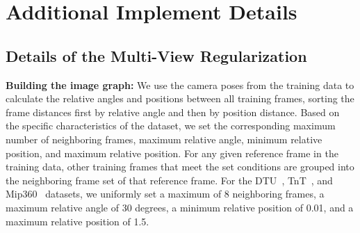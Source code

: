 \clearpage
\setcounter{page}{13}
\setcounter{section}{0}
\setcounter{table}{0}
\setcounter{figure}{0}
\setcounter{equation}{0}
\renewcommand{\thetable}{\thesection\arabic{table}}
\renewcommand{\thefigure}{\thesection\arabic{figure}}
\renewcommand{\theequation}{\thesection\arabic{equation}}

%  

% 



\color{r}

\section{Additional Implement Details}

\subsection{Details of the Multi-View Regularization}
\textbf{Building the image graph:} We use the camera poses from the training data to calculate the relative angles and positions between all training frames, sorting the frame distances first by relative angle and then by position distance. Based on the specific characteristics of the dataset, we set the corresponding maximum number of neighboring frames, maximum relative angle, minimum relative position, and maximum relative position. For any given reference frame in the training data, other training frames that meet the set conditions are grouped into the neighboring frame set of that reference frame. For the DTU~\cite{jensen2014large}, TnT~\cite{knapitsch2017tanks}, and Mip360~\cite{barron2021mip} datasets, we uniformly set a maximum of 8 neighboring frames, a maximum relative angle of 30 degrees, a minimum relative position of 0.01, and a maximum relative position of 1.5.

